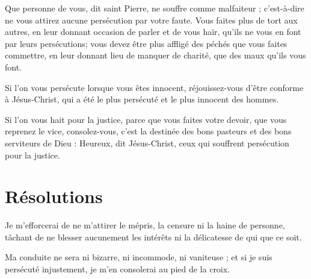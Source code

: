 \documentclass[instructions.tex]{subfiles}
\begin{document}
Que personne de vous, dit saint Pierre, ne souffre comme malfaiteur ; c’est-à-dire ne vous attirez aucune persécution par votre faute. Vous faites plus de tort aux autres, en leur donnant occasion de parler et de vous haïr, qu’ils ne vous en font par leurs persécutions; vous devez être plus affligé des péchés que vous faites commettre, en leur donnant lieu de manquer de charité, que des maux qu’ils vous font.
 
Si l’on vous persécute lorsque vous êtes innocent, réjouissez-vous d’être conforme à Jésus-Christ, qui a été le plus persécuté et le plus innocent des hommes.
 
Si l’on vous hait pour la justice, parce que vous faites votre devoir, que vous reprenez le vice, consolez-vous, c’est la destinée des bons pasteurs et des bons serviteurs de Dieu : Heureux, dit Jésus-Christ, ceux qui souffrent persécution pour la justice.
 
\section{Résolutions}
 
\primo Je m’efforcerai de ne m’attirer le mépris, la censure ni la haine de personne, tâchant de ne blesser aucunement les intérêts ni la délicatesse de qui que ce soit.
 
\secundo Ma conduite ne sera ni bizarre, ni incommode, ni vaniteuse ; et si je suis persécuté injustement, je m’en consolerai au pied de la croix. 

 
\end{document}
